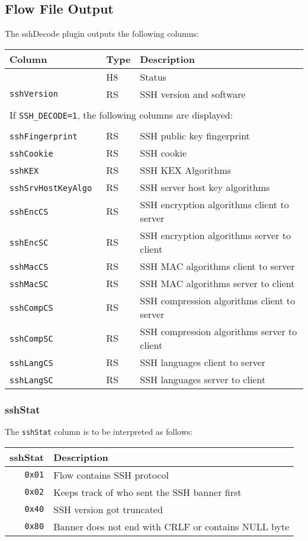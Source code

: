 \documentclass[documentation]{subfiles}
\begin{document}
\subsection{Flow File Output}
The sshDecode plugin outputs the following columns:
\begin{longtable}{lll}
    \toprule
    {\bf Column} & {\bf Type} & {\bf Description}\\ %
    \midrule\endhead%
    {\tt \nameref{sshStat}} & H8 & Status\\
    {\tt sshVersion} & RS & SSH version and software\\\\

    \multicolumn{3}{l}{If {\tt SSH\_DECODE=1}, the following columns are displayed:}\\\\

    {\tt sshFingerprint}    & RS & SSH public key fingerprint\\
    {\tt sshCookie}         & RS & SSH cookie\\
    {\tt sshKEX}            & RS & SSH KEX Algorithms\\
    {\tt sshSrvHostKeyAlgo} & RS & SSH server host key algorithms\\
    {\tt sshEncCS}          & RS & SSH encryption algorithms client to server\\
    {\tt sshEncSC}          & RS & SSH encryption algorithms server to client\\
    {\tt sshMacCS}          & RS & SSH MAC algorithms client to server\\
    {\tt sshMacSC}          & RS & SSH MAC algorithms server to client\\
    {\tt sshCompCS}         & RS & SSH compression algorithms client to server\\
    {\tt sshCompSC}         & RS & SSH compression algorithms server to client\\
    {\tt sshLangCS}         & RS & SSH languages client to server\\
    {\tt sshLangSC}         & RS & SSH languages server to client\\
    \bottomrule
\end{longtable}

\subsubsection{sshStat}\label{sshStat}
The {\tt sshStat} column is to be interpreted as follows:
\begin{longtable}{rl}
    \toprule
    {\bf sshStat} & {\bf Description}\\
    \midrule\endhead%
    {\tt 0x01} & Flow contains SSH protocol\\
    {\tt 0x02} & Keeps track of who sent the SSH banner first\\
    {\tt 0x40} & SSH version got truncated\\
    {\tt 0x80} & Banner does not end with CRLF or contains NULL byte\\
    \bottomrule
\end{longtable}
\end{document}
